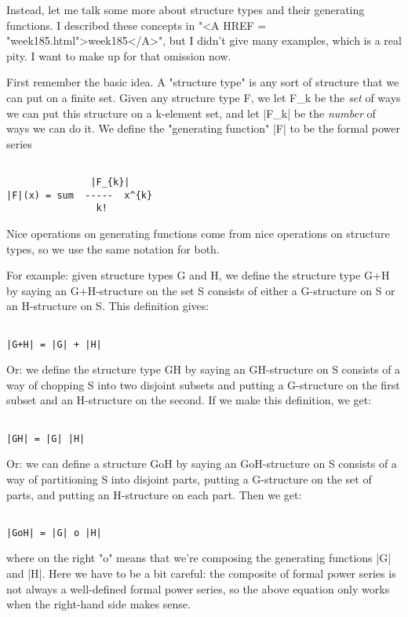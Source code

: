 Instead, let me talk some more about structure types and their generating
functions.  I described these concepts in "<A HREF = "week185.html">week185</A>", but I didn't give
many examples, which is a real pity.  I want to make up for that
omission now.  

First remember the basic idea.  A "structure type" is any sort of
structure that we can put on a finite set.  Given any structure type F,
we let F_{k} be the \emph{set} of ways we can put this structure on a k-element
set, and let |F_{k}| be the \emph{number} of ways we can do it.  We define the 
"generating function" |F| to be the formal power series


\begin{verbatim}

               |F_{k}|  
|F|(x) = sum  -----  x^{k}
                k!
\end{verbatim}
    
Nice operations on generating functions come from nice operations on
structure types, so we use the same notation for both.  

For example: given structure types G and H, we define the structure 
type G+H by saying an G+H-structure on the set S consists of either a
G-structure on S or an H-structure on S.  This definition gives:


\begin{verbatim}

|G+H| = |G| + |H| 
\end{verbatim}
    
Or: we define the structure type GH by saying an GH-structure on S
consists of a way of chopping S into two disjoint subsets and putting 
a G-structure on the first subset and an H-structure on the second.  
If we make this definition, we get:


\begin{verbatim}

|GH| = |G| |H|
\end{verbatim}
    
Or: we can define a structure GoH by saying an GoH-structure on S
consists of a way of partitioning S into disjoint parts, putting 
a G-structure on the set of parts, and putting an H-structure on 
each part.  Then we get:


\begin{verbatim}

|GoH| = |G| o |H|
\end{verbatim}
    
where on the right "o" means that we're composing the generating
functions |G| and |H|.  Here we have to be a bit careful: the
composite of formal power series is not always a well-defined 
formal power series, so the above equation only works when the
right-hand side makes sense.

